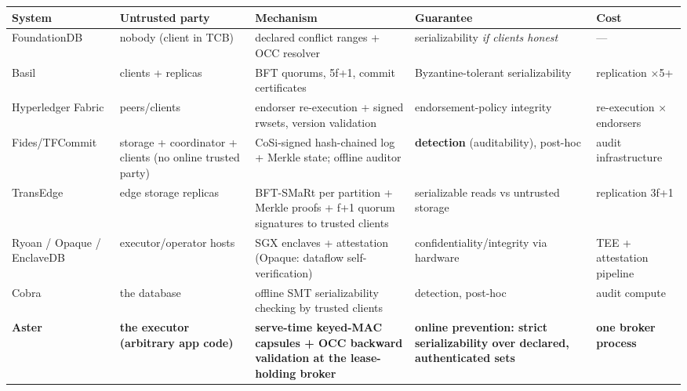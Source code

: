 \documentclass[
  11pt,
]{article}
\newcounter{none} %
\begin{document}
{\def\LTcaptype{none} %
\begin{longtable}[]{@{}
  >{\raggedright\arraybackslash}p{}
  >{\raggedright\arraybackslash}p{}
  >{\raggedright\arraybackslash}p{}
  >{\raggedright\arraybackslash}p{}
  >{\raggedright\arraybackslash}p{}@{}}
\toprule\noalign{}
\begin{minipage}[b]{\linewidth}\raggedright
System
\end{minipage} & \begin{minipage}[b]{\linewidth}\raggedright
Untrusted party
\end{minipage} & \begin{minipage}[b]{\linewidth}\raggedright
Mechanism
\end{minipage} & \begin{minipage}[b]{\linewidth}\raggedright
Guarantee
\end{minipage} & \begin{minipage}[b]{\linewidth}\raggedright
Cost
\end{minipage} \\
\midrule\noalign{}
\endhead
\bottomrule\noalign{}
\endlastfoot
FoundationDB \cite{fdb2021} & nobody (client in TCB) & declared conflict ranges + OCC resolver & serializability \emph{if clients honest} & --- \\
Basil \cite{basil2021} & clients + replicas & BFT quorums, 5f+1, commit certificates & Byzantine-tolerant serializability & replication $\times$5+ \\
Hyperledger Fabric \cite{fabricdocs} & peers/clients & endorser re-execution + signed rwsets, version validation & endorsement-policy integrity & re-execution $\times$endorsers \\
Fides/TFCommit \cite{fides2020} & storage + coordinator + clients (no online trusted party) & CoSi-signed hash-chained log + Merkle state; offline auditor & \textbf{detection} (auditability), post-hoc & audit infrastructure \\
TransEdge \cite{transedge2023} & edge storage replicas & BFT-SMaRt per partition + Merkle proofs + f+1 quorum signatures to trusted clients & serializable reads vs untrusted storage & replication 3f+1 \\
Ryoan / Opaque / EnclaveDB \cite{ryoan2016,opaque2017,enclavedb2018} & executor/operator hosts & SGX enclaves + attestation (Opaque: dataflow self-verification) & confidentiality/integrity via hardware & TEE + attestation pipeline \\
Cobra \cite{cobra2020} & the database & offline SMT serializability checking by trusted clients & detection, post-hoc & audit compute \\
\textbf{Aster} & \textbf{the executor (arbitrary app code)} & \textbf{serve-time keyed-MAC capsules + OCC backward validation at the lease-holding broker} & \textbf{online prevention: strict serializability over declared, authenticated sets} & \textbf{one broker process} \\
\end{longtable}
}
\end{document}
